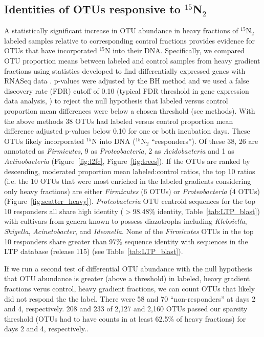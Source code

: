 \subsection{Identities of OTUs responsive to $^{15}$N$_{2}$} 
A statistically significant increase in OTU abundance in heavy fractions of
$^{15}$N$_{2}$ labeled samples relative to corresponding control fractions
provides evidence for OTUs that have incorporated $^{15}$N into their DNA.
Specifically, we compared OTU proportion means between labeled and
control samples from heavy gradient fractions using statistics developed to
find differentially expressed genes with RNASeq data \citep{24699258,
Love_2014}. p-values were adjusted by the BH method \citep{citeulike:1042553}
and we used a false discovery rate (FDR) cutoff of 0.10 (typical FDR threshold
in gene expression data analysis, \citep{Love_2014}) to reject the null
hypothesis that labeled versus control proportion mean differences were below a
chosen threshold (see methods). With the above methods 38 OTUs had labeled
versus control proportion mean difference adjusted p-values below 0.10 for one
or both incubation days.  These OTUs likely incorporated $^{15}$N into DNA
($^{15}$N$_{2}$ ``responders''). Of these 38, 26 are annotated as
\textit{Firmicutes}, 9 as \textit{Proteobacteria}, 2 as \textit{Acidobacteria}
and 1 as \textit{Actinobacteria} (Figure~\ref{fig:l2fc},
Figure~\ref{fig:trees}). If the OTUs are ranked by descending, moderated
proportion mean labeled:control ratios, the top 10 ratios (i.e. the 10 OTUs
that were most enriched in the labeled gradients considering only heavy
fractions) are either \textit{Firmicutes} (6 OTUs) or \textit{Proteobacteria}
(4 OTUs) (Figure~\ref{fig:scatter_heavy}).  \textit{Proteobacteria} OTU
centroid sequences for the top 10 responders all share high identity
($>$98.48\% identity, Table~\ref{tab:LTP_blast}) with cultivars from genera
known to possess diazotrophs including \textit{Klebsiella}, \textit{Shigella},
\textit{Acinetobacter}, and \textit{Ideonella}. None of the \textit{Firmicutes}
OTUs in the top 10 responders share greater than 97\% sequence identity with
sequences in the LTP database (release 115) (see Table~\ref{tab:LTP_blast}).

If we run a second test of differential OTU abundance with the null hypothesis
that OTU abundance is greater (above a threshold) in labeled, heavy gradient
fractions verus control, heavy gradient fractions, we can count OTUs that likely
did not respond the the label. There were 58 and 70 ``non-responders'' at days
2 and 4, respectively. 208 and 233 of 2,127 and 2,160 OTUs passed our sparsity
threshold (OTUs had to have counts in at least 62.5\% of heavy fractions) for
days 2 and 4, respectively..

